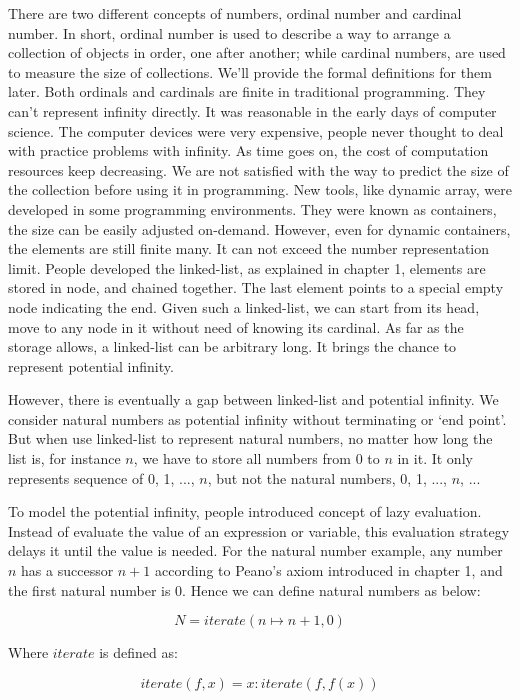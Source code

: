\documentclass{article}
\begin{document}
There are two different concepts of numbers, ordinal number and cardinal number. In short, ordinal number is used to describe a way to arrange a collection of objects in order, one after another; while cardinal numbers, are used to measure the size of collections. We'll provide the formal definitions for them later. Both ordinals and cardinals are finite in traditional programming. They can't represent infinity directly. It was reasonable in the early days of computer science. The computer devices were very expensive, people never thought to deal with practice problems with infinity. As time goes on, the cost of computation resources keep decreasing. We are not satisfied with the way to predict the size of the collection before using it in programming. New tools, like dynamic array, were developed in some programming environments. They were known as containers, the size can be easily adjusted on-demand. However, even for dynamic containers, the elements are still finite many. It can not exceed the number representation limit. People developed the linked-list, as explained in chapter 1, elements are stored in node, and chained together. The last element points to a special empty node indicating the end. Given such a linked-list, we can start from its head, move to any node in it without need of knowing its cardinal. As far as the storage allows, a linked-list can be arbitrary long. It brings the chance to represent potential infinity.

However, there is eventually a gap between linked-list and potential infinity. We consider natural numbers as potential infinity without terminating or `end point'. But when use linked-list to represent natural numbers, no matter how long the list is, for instance $n$, we have to store all numbers from 0 to $n$ in it. It only represents sequence of 0, 1, ..., $n$, but not the natural numbers, 0, 1, ..., $n$, ...

To model the potential infinity, people introduced concept of lazy evaluation. Instead of evaluate the value of an expression or variable, this evaluation strategy delays it until the value is needed. For the natural number example, any number $n$ has a successor $n+1$ according to Peano's axiom introduced in chapter 1, and the first natural number is 0. Hence we can define natural numbers as below:

\[
N = iterate(n \mapsto n + 1, 0)
\]

Where $iterate$ is defined as:

\[
iterate(f, x) = x : iterate(f, f(x))
\]
\end{document}
